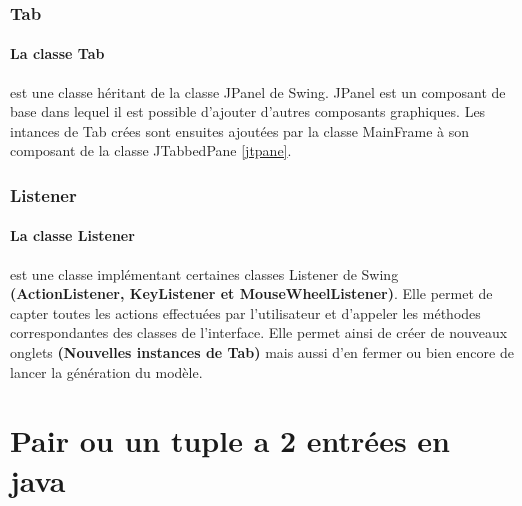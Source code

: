 \subsubsection{Tab}
\paragraph{La classe Tab } est une classe héritant de la classe JPanel de Swing. JPanel est un composant de base dans lequel il est possible d'ajouter d'autres composants graphiques. Les intances de Tab crées sont ensuites ajoutées par la classe MainFrame à son composant de la classe JTabbedPane \ref{jtpane}.

\subsubsection{Listener}
\paragraph{La classe Listener} est une classe implémentant certaines classes Listener de Swing \textbf{(ActionListener, KeyListener et MouseWheelListener)}. Elle permet de capter toutes les actions effectuées par l'utilisateur et d'appeler les méthodes correspondantes des classes de l'interface. Elle permet ainsi de créer de nouveaux onglets \textbf{(Nouvelles instances de Tab)} mais aussi d'en fermer ou bien encore de lancer la génération du modèle.
\section{Pair ou un tuple a 2 entrées en java}